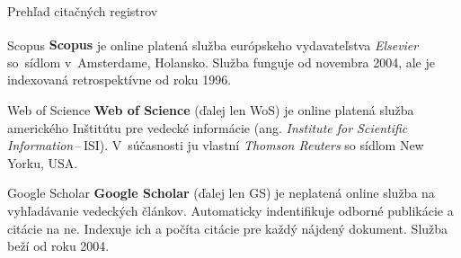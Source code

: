 \documentclass{beamer}
\newcommand{\tm}{\texttrademark}
\newcommand{\R}{\textsuperscript{\textregistered}}
\begin{document}
%
%
\begin{frame}{Prehľad citačných registrov}
  \footnotesize

  \begin{block}{Scopus}
    \textbf{Scopus\R} je online platená služba európskeho vydavateľstva
    \emph{Elsevier} so~sídlom v~Amsterdame, Holansko. Služba funguje od
    novembra 2004, ale je indexovaná retrospektívne od roku 1996.

  \end{block}


  \begin{block}{Web of Science}
    \textbf{Web of Science\tm} (ďalej len WoS) je online platená služba amerického
    Inštitútu pre vedecké informácie (ang. \emph{Institute for Scientific
    Information}\,--\,ISI).  V~súčasnosti ju vlastní \emph{Thomson Reuters}
    so sídlom New Yorku, USA.
  \end{block}


  \begin{block}{Google Scholar}
    \textbf{Google Scholar} (ďalej len GS) je neplatená online služba na
    vyhľadávanie vedeckých článkov. Automaticky indentifikuje odborné
    publikácie a citácie na ne. Indexuje ich a počíta citácie pre každý nájdený
    dokument.  Služba beží od roku 2004.
  \end{block}
\end{frame}

%
%

%
%

%
%
\end{document}
